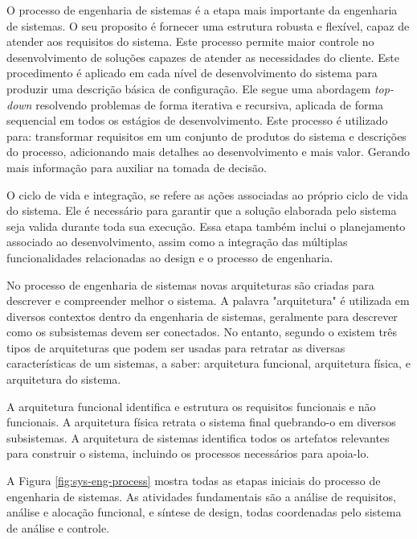     O processo de engenharia de sistemas é a etapa mais importante da engenharia de sistemas. O seu proposito é fornecer uma estrutura robusta e flexível, capaz de atender aos requisitos do sistema. Este processo permite maior controle no desenvolvimento de soluções capazes de atender as necessidades do cliente. Este procedimento é aplicado em cada nível de desenvolvimento do sistema para produzir uma descrição básica de configuração. Ele segue uma abordagem \textit{top-down} resolvendo problemas de forma iterativa e recursiva, aplicada de forma sequencial em todos os estágios de desenvolvimento. Este processo é utilizado para: transformar requisitos em um conjunto de produtos do sistema e descrições do processo, adicionando mais detalhes ao desenvolvimento e mais valor. Gerando mais informação para auxiliar na tomada de decisão.

    O ciclo de vida e integração, se refere as ações associadas ao próprio ciclo de vida do sistema. Ele é necessário para garantir que a solução elaborada pelo sistema seja valida durante toda sua execução. Essa etapa também inclui o planejamento associado ao desenvolvimento, assim como a integração das múltiplas funcionalidades relacionadas ao design e o processo de engenharia.


    No processo de engenharia de sistemas novas arquiteturas são criadas para descrever e compreender melhor o sistema. A palavra "arquitetura" é utilizada em diversos contextos dentro da engenharia de sistemas, geralmente para descrever como os subsistemas devem ser conectados. No entanto, segundo o  existem três tipos de arquiteturas que podem ser usadas para retratar as diversas características de um sistemas, a saber: arquitetura funcional, arquitetura física, e arquitetura do sistema. 
    
    A arquitetura funcional identifica e estrutura os requisitos funcionais e não funcionais. A arquitetura física retrata o sistema final quebrando-o em diversos subsistemas. A arquitetura de sistemas identifica todos os artefatos relevantes para construir o sistema, incluindo os processos necessários para apoia-lo.
    
    A Figura \ref{fig:sys-eng-process} mostra todas as etapas iniciais do processo de engenharia de sistemas. As atividades fundamentais são a análise de requisitos, análise e alocação funcional, e síntese de design, todas coordenadas pelo sistema de análise e controle.
        
